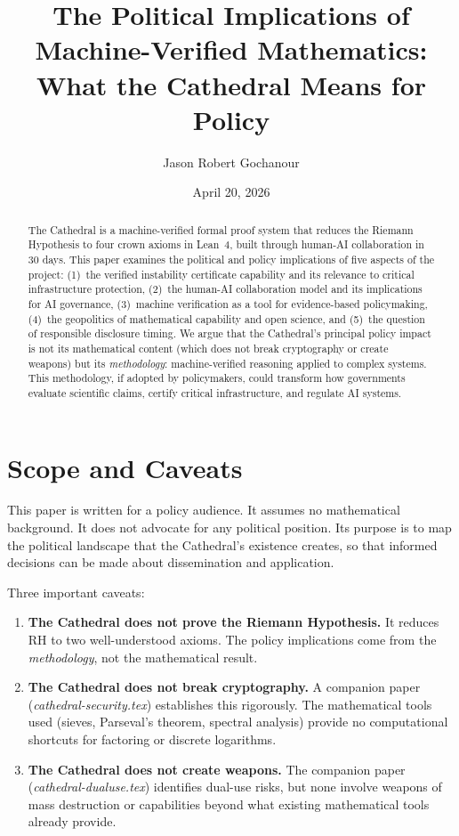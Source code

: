 \documentclass[11pt,a4paper]{article}
\title{%
  The Political Implications of Machine-Verified Mathematics:\\
  What the Cathedral Means for Policy%
}
\author{
  Jason Robert Gochanour
}
\date{April 20, 2026}
\begin{document}
\maketitle

\begin{abstract}
The Cathedral is a machine-verified formal proof system that reduces
the Riemann Hypothesis to four crown axioms in Lean~4, built through
human-AI collaboration in 30 days. This paper examines the political
and policy implications of five aspects of the project: (1)~the
verified instability certificate capability and its relevance to
critical infrastructure protection, (2)~the human-AI collaboration
model and its implications for AI governance, (3)~machine
verification as a tool for evidence-based policymaking,
(4)~the geopolitics of mathematical capability and open science, and
(5)~the question of responsible disclosure timing. We argue that
the Cathedral's principal policy impact is not its mathematical
content (which does not break cryptography or create weapons) but
its \emph{methodology}: machine-verified reasoning applied to
complex systems. This methodology, if adopted by policymakers,
could transform how governments evaluate scientific claims,
certify critical infrastructure, and regulate AI systems.
\end{abstract}

\tableofcontents

\section{Scope and Caveats}

This paper is written for a policy audience. It assumes no
mathematical background. It does not advocate for any political
position. Its purpose is to map the political landscape that
the Cathedral's existence creates, so that informed decisions can
be made about dissemination and application.

Three important caveats:

\begin{enumerate}
  \item \textbf{The Cathedral does not prove the Riemann Hypothesis.}
    It reduces RH to two well-understood axioms. The policy
    implications come from the \emph{methodology}, not the
    mathematical result.

  \item \textbf{The Cathedral does not break cryptography.} A
    companion paper (\emph{cathedral-security.tex}) establishes this
    rigorously. The mathematical tools used (sieves, Parseval's
    theorem, spectral analysis) provide no computational shortcuts
    for factoring or discrete logarithms.

  \item \textbf{The Cathedral does not create weapons.} The
    companion paper (\emph{cathedral-dualuse.tex}) identifies
    dual-use risks, but none involve weapons of mass destruction
    or capabilities beyond what existing mathematical tools already
    provide.
\end{enumerate}
\end{document}
